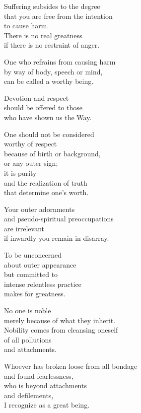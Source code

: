Suffering subsides to the degree\\
that you are free from the intention\\
to cause harm.\\
There is no real greatness\\
if there is no restraint of anger.


One who refrains from causing harm\\
by way of body, speech or mind,\\
can be called a worthy being.


Devotion and respect\\
should be offered to those\\
who have shown us the Way.


One should not be considered\\
worthy of respect\\
because of birth or background,\\
or any outer sign;\\
it is purity\\
and the realization of truth\\
that determine one's worth.


Your outer adornments\\
and pseudo-spiritual preoccupations\\
are irrelevant\\
if inwardly you remain in disarray.


To be unconcerned\\
about outer appearance\\
but committed to\\
intense relentless practice\\
makes for greatness.


No one is noble\\
merely because of what they inherit.\\
Nobility comes from cleansing oneself\\
of all pollutions\\
and attachments.


Whoever has broken loose from all bondage\\
and found fearlessness,\\
who is beyond attachments\\
and defilements,\\
I recognize as a great being.


